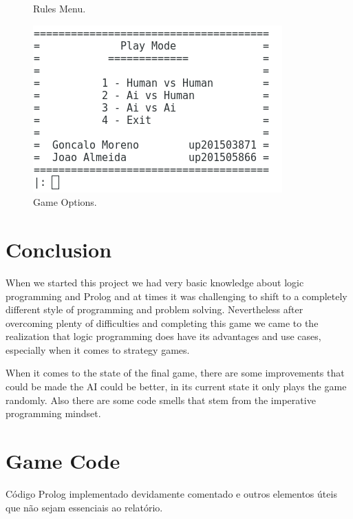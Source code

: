\documentclass[a4paper]{article}
\begin{document}
\begin{figure}[H]
  \caption{Rules Menu.}\label{fig:menu_info}
\endminipage \hspace{2mm}
%
  \includegraphics[width=\linewidth]{menu_play.png}\hspace{0.5cm}
  \caption{Game Options.}\label{fig:menu_play}
\endminipage\hfill


\end{figure}

%



\section{Conclusion}
When we started this project we had very basic knowledge about logic programming and Prolog and at times
it was challenging to shift to a completely different style of programming and problem solving.
Nevertheless after overcoming plenty of difficulties and completing this game we came to the realization
that logic programming does have its advantages and use cases, especially when it comes to strategy games.
\par
When it comes to the state of the final game, there are some improvements that could be made the AI could be better,
in its current state it only plays the game randomly. Also there are some code smells that stem from the imperative programming
mindset.





\clearpage
{}
\renewcommand\refname{Bibliografia}



\newpage
\appendix
\section{Game Code}
Código Prolog implementado devidamente comentado e outros elementos úteis que não sejam essenciais ao relatório.
\end{document}
